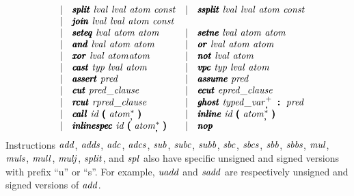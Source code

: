 \documentclass{article}
\begin{document}
\[\begin{array}{rclcl}
         & \mid & \pmb\isplit\ \lval\ \lval\ \atom\ \const 
         & \mid & \pmb\issplit\ \lval\ \lval\ \atom\ \const \\
         & \mid & \pmb\ijoin\ \lval\ \lval\ \atom\ \const \\
         & \mid & \pmb\iseteq\ \lval\ \atom\ \atom
         & \mid & \pmb\isetne\ \lval\ \atom\ \atom \\
         & \mid & \pmb\iand\ \lval\ \atom\ \atom
         & \mid & \pmb\ior\ \lval\ \atom\ \atom \\
         & \mid & \pmb\ixor\ \lval\ \atom \atom
         & \mid & \pmb\inot\ \lval\ \atom \\
         & \mid & \pmb\icast\ \typ\ \lval\ \atom
         & \mid & \pmb\ivpc\ \typ\ \lval\ \atom \\
         & \mid & \pmb\iassert\ \pred
         & \mid & \pmb\iassume\ \pred \\
         & \mid & \pmb\icut\ \predclause
         & \mid & \pmb\iecut\ \epredclause \\
         & \mid & \pmb\ircut\ \rpredclause
         & \mid & \pmb\ighost\ \tvar_{\pmb,}^+\ \pmb{:}\ \pred \\
         & \mid & \pmb\icall\ \id\ \pmb{(}\ \atom_{\pmb,}^*\ \pmb{)}
         & \mid & \pmb\iinline\ \id\ \pmb{(}\ \atom_{\pmb,}^*\ \pmb{)} \\
         & \mid & \pmb\iinlinespec\ \id\ \pmb{(}\ \atom_{\pmb,}^*\ \pmb{)}
         & \mid & \pmb\inop \\
\end{array}
\]
Instructions $\mathit{add}$, $\mathit{adds}$, $\mathit{adc}$, $\mathit{adcs}$, $\mathit{sub}$, $\mathit{subc}$,
$\mathit{subb}$, $\mathit{sbc}$, $\mathit{sbcs}$, $\mathit{sbb}$, $\mathit{sbbs}$, $\mathit{mul}$, $\mathit{muls}$,
$\mathit{mull}$, $\mathit{mulj}$, $\mathit{split}$, and $\mathit{spl}$ also have specific unsigned
and signed versions with prefix ``u'' or ``s''.
For example, $\mathit{uadd}$ and $\mathit{sadd}$ are respectively unsigned and
signed versions of $\mathit{add}$.
\end{document}
